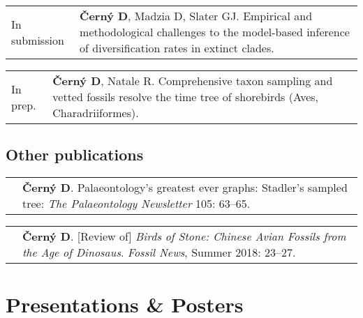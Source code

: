 \documentclass[10pt]{article}
\begin{document}
\begin{tabularx}{\textwidth}{>{\raggedleft\arraybackslash}p{2.2cm} X}
In submission & \textbf{\v{C}ern\'{y} D}, Madzia D, Slater GJ. Empirical and methodological challenges to the model-based inference of diversification rates in extinct clades.
\end{tabularx}
\begin{tabularx}{\textwidth}{>{\raggedleft\arraybackslash}p{2.2cm} X}
In prep. & \textbf{\v{C}ern\'{y} D}, Natale R. Comprehensive taxon sampling and vetted fossils resolve the time tree of shorebirds (Aves, Charadriiformes).
\end{tabularx}

\subsection*{Other publications}

\begin{tabularx}{\textwidth}{>{\raggedleft\arraybackslash}p{2.2cm} X}
2020 & \textbf{\v{C}ern\'{y} D}. Palaeontology's greatest ever graphs:
Stadler's sampled tree: \textit{The Palaeontology Newsletter} 105: 63--65.
\end{tabularx}
\begin{tabularx}{\textwidth}{>{\raggedleft\arraybackslash}p{2.2cm} X}
2018 & \textbf{\v{C}ern\'{y} D}. [Review of] \textit{Birds of Stone: Chinese Avian Fossils from the Age of Dinosaus}. \textit{Fossil News}, Summer 2018: 23--27.
\end{tabularx}

\section*{Presentations \& Posters}
\end{document}

